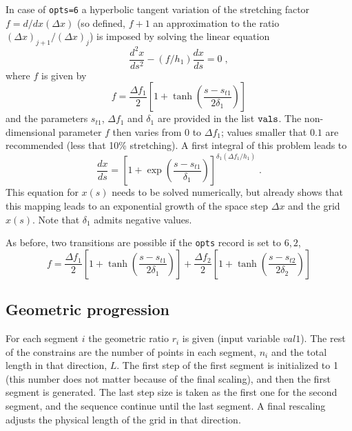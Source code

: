 In case of {\tt opts=6} a hyperbolic tangent variation of the stretching factor
$f=d/dx (\Delta x)$ (so defined, $f+1$ an approximation to the ratio $(\Delta x)
_{j+1}/(\Delta x) _{j} $) is imposed by solving the linear equation
\begin{equation}
\frac{d^2x}{ds^2} - (f/h_1)\frac{dx}{ds} = 0 \;,
\end{equation}
where $f$ is given by
\begin{equation}
f = \frac{\Delta f_1}{2}\left[ 1 + \tanh\left(\frac{s-s_{t1}}{2\delta_1}\right)\right]
\end{equation}
and the parameters $s_{t1}$, $\Delta f_1$ and $\delta_1$ are provided in the list
${\tt vals}$. The non-dimensional parameter $f$ then varies from $0$ to $\Delta
f_1$; values smaller that $0.1$ are recommended (less that 10\% stretching). A
first integral of this problem leads to
\begin{equation}
\frac{dx}{ds} =
\left[1+\exp\left(\frac{s-s_{t1}}{\delta_1}\right)\right]^{\delta_1(\Delta f_1/h_1)} \;.
\end{equation}
This equation for $x(s)$ needs to be solved numerically, but already shows that
this mapping leads to an exponential growth of the space step $\Delta x$ and the
grid $x(s)$. Note that $\delta_1$ admits negative values.

As before, two transitions are possible if the {\tt opts} record is set to $6,2$,
\begin{equation}
f = \frac{\Delta f_1}{2}\left[ 1 + \tanh\left(\frac{s-s_{t1}}{2\delta_1}\right)\right]
+ \frac{\Delta f_2}{2}\left[ 1 + \tanh\left(\frac{s-s_{t2}}{2\delta_2}\right)\right]
\end{equation}

\subsection{Geometric progression}
For each segment $i$ the geometric ratio $r_i$ is given (input variable
$val1$). The rest of the constrains are the number of points in each segment,
$n_i$ and the total length in that direction, $L$.  The first step of the first
segment is initialized to 1 (this number does not matter because of the final
scaling), and then the first segment is generated. The last step size is taken
as the first one for the second segment, and the sequence continue until the
last segment. A final rescaling adjusts the physical length of the grid in that
direction.

